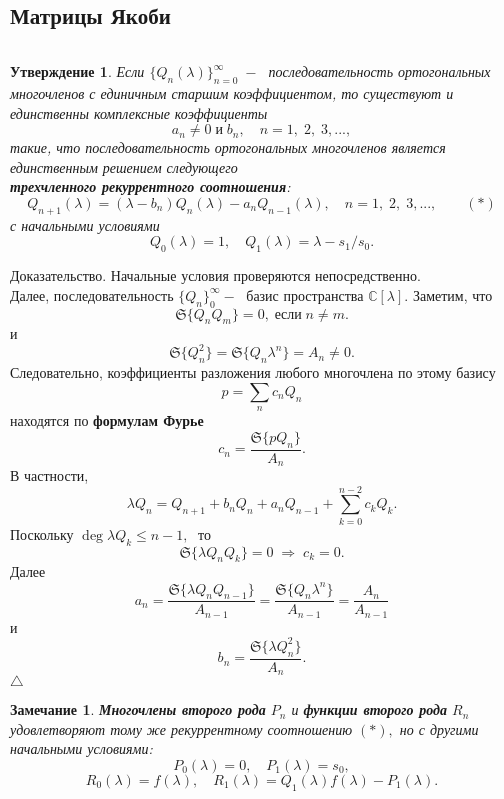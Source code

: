 \documentclass[12pt,a4paper]{article}
\theoremstyle{plain}   \newtheorem{Pro}{Задача}
\newtheorem{Sta}{Утверждение}
\newtheorem{Rem}{Замечание}
\begin{document}
\subsection{Матрицы Якоби}
$ \; $
\\

\begin{Sta}
Если
$ \{ Q_n (\lambda ) \} _{n=0}^{\infty} \; - \; $
последовательность ортогональных многочленов с единичным
старшим коэффициентом, то существуют и единственны
комплексные коэффициенты
$$
  a_n \not = 0  \; и \; b_n ,
  \quad n=1, \; 2, \; 3,...,
$$
такие, что последовательность ортогональных многочленов
является единственным решением следующего\\
{\bfseries трехчленного рекуррентного соотношения}:
$$
  Q_{n+1}(\lambda )=
  (\lambda -b_n )Q_n (\lambda )-
  a_n Q_{n-1}(\lambda ),
  \quad n=1, \; 2, \; 3,...,
  \qquad (\ast )
$$
с начальными условиями
$$
  Q_0 (\lambda )=1, \quad
  Q_1 (\lambda )=\lambda - s_1 /s_0 .
$$
\end{Sta}
{\Large Доказательство.}
Начальные условия проверяются непосредственно.\\
Далее, последовательность
$ \{ Q_n \}_0 ^{\infty} - \; $
базис пространства
$ \mathbb{C}[\lambda ]. $
Заметим, что
$$
  \mathfrak{S} \{ Q_n Q_m \} =0, \; если \; n \not = m .
$$
и
$$
  \mathfrak{S} \{ Q_n ^2 \} =
  \mathfrak{S} \{ Q_n \lambda ^n \} =
  A_n \not =0.
$$
Следовательно, коэффициенты разложения любого многочлена по
этому базису
$$
  p=\sum _n c_n Q_n
$$
находятся по
{\bfseries формулам Фурье}
$$
  c_n = \frac{\mathfrak{S} \{ pQ_n \} }
  {A_n }.
$$
В частности,
$$
  \lambda Q_n =Q_{n+1}+b_n Q_n +a_n Q_{n-1}+
  \sum _{k=0}^{n-2} c_k Q_k .
$$
Поскольку
$ \deg \lambda Q_k \leq n-1, \; $
то
$$
  \mathfrak{S} \{ \lambda Q_n Q_k \} =0 \;
  \Rightarrow \; c_k =0.
$$
Далее
$$
  a_n =\frac{\mathfrak{S} \{ \lambda Q_n Q_{n-1} \} }
  {A_{n-1}} =
  \frac{\mathfrak{S} \{ Q_n \lambda ^n \} }{A_{n-1}}=
  \frac{A_n }{A_{n-1}}
$$
и
$$
  b_n =\frac{\mathfrak{S} \{ \lambda Q_n ^2 \} }
  {A_n }.
$$
$ \triangle $
\begin{Rem}
{\bfseries Многочлены второго рода}
$ P_n $
и
{\bfseries функции второго рода}
$ R_n $
удовлетворяют тому же рекуррентному соотношению
$ (\ast ) , $
но с другими начальными условиями:
$$
  P_0 (\lambda )=0, \quad
  P_1 (\lambda )=s_0 ,
$$
$$
  R_0 (\lambda )=f( \lambda ), \quad
  R_1 (\lambda )=Q_1 (\lambda )f(\lambda )-P_1 (\lambda ).
$$
\end{Rem}
$ \; $
\\
\end{document}
